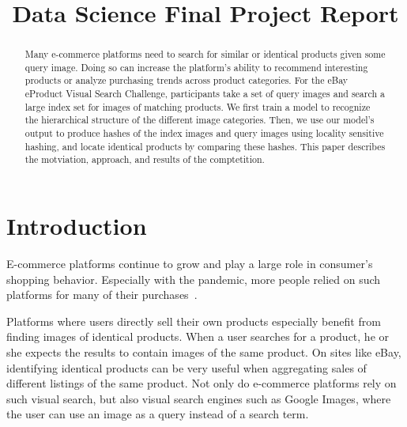 \documentclass[conference]{IEEEtran}
\begin{document}
\title{Data Science Final Project Report}
\author{
}

\maketitle
\begin{abstract}
	Many e-commerce platforms need to search for similar or identical products
	given some query image.
	Doing so can increase the platform's ability to recommend interesting 
	products or analyze purchasing trends across product categories.
	For the eBay eProduct Visual Search Challenge, participants take a set
	of query images and search a large index set for images of matching products.
	We first train a model to recognize the hierarchical structure of the different
	image categories.
	Then, we use our model's output to produce hashes of the index images
	and query images using locality sensitive hashing, and locate identical products by comparing these hashes.
	This paper describes the motviation, approach, and results of the 
	comptetition.
\end{abstract}

\section{Introduction}
E-commerce platforms continue to grow and play a large role in consumer's
shopping behavior.
Especially with the pandemic, more people relied on such platforms for 
many of their purchases~\cite{jilkova2021digital}.

Platforms where users directly sell their own products especially
benefit from finding images of identical products.
When a user searches for a product, he or she expects the results to contain
images of the same product.
On sites like eBay, identifying identical products can be very useful when 
aggregating sales of different listings of the same product.
Not only do e-commerce platforms rely on such visual search, but also visual
search engines such as Google Images, where the user can use an image as a query
instead of a search term.
\end{document}
